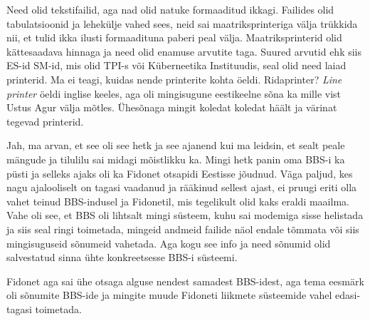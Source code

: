 
Need olid tekstifailid, aga nad olid natuke formaaditud ikkagi. Failides olid 
tabulatsioonid ja lehekülje vahed  sees, neid sai maatriksprinteriga välja 
trükkida nii, et tulid ikka ilusti formaadituna paberi peal välja. 
Maatriksprinterid olid kättesaadava hinnaga ja need olid enamuse arvutite taga. 
 Suured arvutid ehk siis ES-id SM-id, mis olid TPI-s või Küberneetika 
Instituudis, seal olid need laiad printerid. Ma ei teagi, kuidas nende 
printerite kohta öeldi. Ridaprinter? \emph{Line printer} öeldi inglise keeles, 
aga  oli mingisugune eestikeelne sõna ka mille vist Ustus Agur välja mõtles. Ühesõnaga mingit koledat koledat häält ja värinat tegevad 
printerid.


Jah, ma arvan, et see oli see hetk ja see ajanend kui ma leidsin, et sealt  
peale mängude ja  tilulilu sai midagi mõistlikku ka. Mingi hetk panin oma BBS-i 
ka püsti ja selleks ajaks oli ka Fidonet otsapidi Eestisse 
jõudnud. Väga paljud, kes nagu ajalooliselt on tagasi vaadanud ja rääkinud 
sellest ajast, ei pruugi eriti olla vahet teinud BBS-indusel ja Fidonetil,  mis 
tegelikult  olid kaks eraldi maailma. Vahe oli see, et BBS oli lihtsalt mingi 
süsteem, kuhu sai modemiga sisse helistada ja siis seal ringi toimetada,  
mingeid andmeid failide näol endale tõmmata või siis mingisuguseid sõnumeid 
vahetada. Aga kogu see info ja need sõnumid olid salvestatud sinna ühte 
konkreetsesse BBS-i süsteemi.

Fidonet aga sai ühe otsaga  alguse nendest samadest BBS-idest, aga tema eesmärk 
oli sõnumite BBS-ide ja mingite muude Fidoneti liikmete süsteemide vahel 
edasi-tagasi toimetada. 


